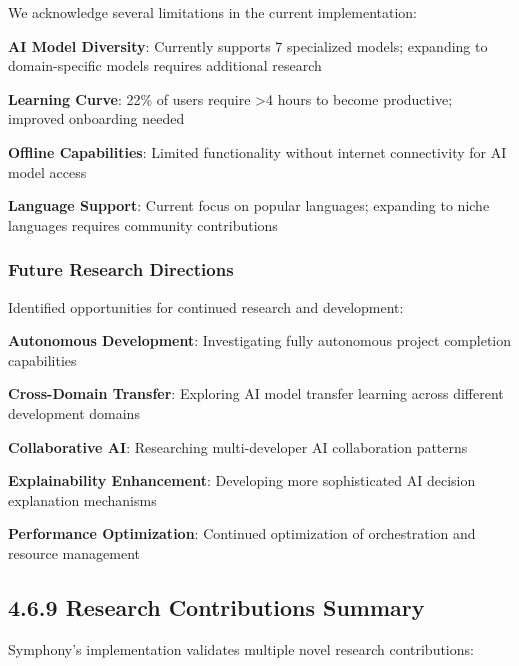 We acknowledge several limitations in the current implementation:

\begin{expandedlist}
    \item \textbf{AI Model Diversity}: Currently supports 7 specialized models; expanding to domain-specific models requires additional research
    \item \textbf{Learning Curve}: 22\% of users require >4 hours to become productive; improved onboarding needed
    \item \textbf{Offline Capabilities}: Limited functionality without internet connectivity for AI model access
    \item \textbf{Language Support}: Current focus on popular languages; expanding to niche languages requires community contributions
\end{expandedlist}

\subsubsection*{Future Research Directions}

Identified opportunities for continued research and development:

\begin{compactlist}
    \item \textbf{Autonomous Development}: Investigating fully autonomous project completion capabilities
    \item \textbf{Cross-Domain Transfer}: Exploring AI model transfer learning across different development domains
    \item \textbf{Collaborative AI}: Researching multi-developer AI collaboration patterns
    \item \textbf{Explainability Enhancement}: Developing more sophisticated AI decision explanation mechanisms
    \item \textbf{Performance Optimization}: Continued optimization of orchestration and resource management
\end{compactlist}

\subsection*{4.6.9 Research Contributions Summary}
\label{subsec:research-contributions-summary}

Symphony's implementation validates multiple novel research contributions:

